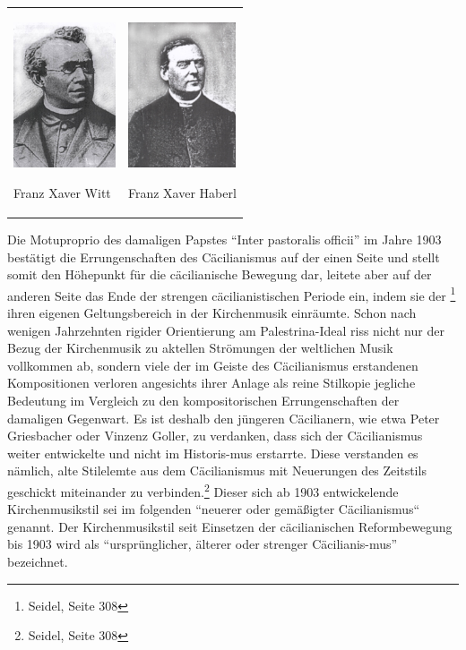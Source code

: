 \begin{center}
\begin{minipage}{6.943cm}
\begin{flushleft}
\tablefirsthead{}
\tablehead{}
\tabletail{}
\tablelasttail{}
\begin{supertabular}{m{3.197cm}m{3.345cm}}

\includegraphics[width=3.016cm,height=4.284cm]{pictures/zulassungsarbeit-img078.jpg}

Franz Xaver Witt &

\includegraphics[width=3.163cm,height=4.3cm]{pictures/zulassungsarbeit-img079.jpg}

Franz Xaver Haberl\\
\end{supertabular}
\end{flushleft}
\end{minipage}
\end{center}
Die Motuproprio des damaligen Papstes “Inter pastoralis officii” im
Jahre 1903 bestätigt die Errungenschaften des Cäcilianismus auf der
einen Seite und stellt somit den Höhepunkt für die cäcilianische
Bewegung dar, leitete aber auf der anderen Seite das Ende der strengen
cäcilianistischen Periode ein, indem sie der  \footnote{Seidel, Seite 308} ihren eigenen Geltungsbereich in
der Kirchenmusik einräumte. Schon nach wenigen Jahrzehnten rigider
Orientierung am Palestrina-Ideal riss nicht nur der Bezug der
Kirchenmusik zu aktellen Strömungen der weltlichen Musik vollkommen ab,
sondern viele der im Geiste des Cäcilianismus erstandenen Kompositionen
verloren angesichts ihrer Anlage als reine Stilkopie jegliche Bedeutung
im Vergleich zu den kompositorischen Errungenschaften der damaligen
Gegenwart. Es ist deshalb den jüngeren Cäcilianern, wie etwa Peter
Griesbacher oder Vinzenz Goller, zu verdanken, dass sich der
Cäcilianismus weiter entwickelte und nicht im Historis-mus erstarrte.
Diese verstanden es nämlich, alte Stilelemte aus dem Cäcilianismus mit
Neuerungen des Zeitstils geschickt miteinander zu verbinden.\footnote{
Seidel, Seite 308} Dieser sich ab 1903 entwickelende Kirchenmusikstil
sei im folgenden “neuerer oder gemäßigter Cäcilianismus“ genannt. Der
Kirchenmusikstil seit Einsetzen der cäcilianischen Reformbewegung bis
1903 wird als “ursprünglicher, älterer oder strenger Cäcilianis-mus”
bezeichnet.

